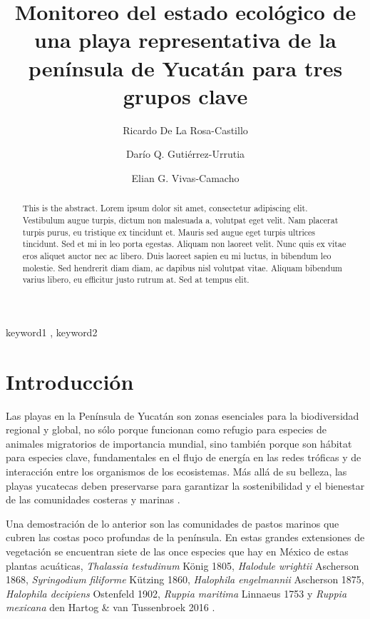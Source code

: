 \documentclass[
  authoryear,
  preprint,
  3p,
  twocolumn]{elsarticle}
\begin{document}
\begin{frontmatter}
\title{Monitoreo del estado ecológico de una playa representativa de la
península de Yucatán para tres grupos clave}
\author[]{Ricardo De La Rosa-Castillo%
%
}
\author[]{Darío Q. Gutiérrez-Urrutia%
%
}
\author[]{Elian G. Vivas-Camacho%
%
}





        
\begin{abstract}
This is the abstract. Lorem ipsum dolor sit amet, consectetur adipiscing
elit. Vestibulum augue turpis, dictum non malesuada a, volutpat eget
velit. Nam placerat turpis purus, eu tristique ex tincidunt et. Mauris
sed augue eget turpis ultrices tincidunt. Sed et mi in leo porta
egestas. Aliquam non laoreet velit. Nunc quis ex vitae eros aliquet
auctor nec ac libero. Duis laoreet sapien eu mi luctus, in bibendum leo
molestie. Sed hendrerit diam diam, ac dapibus nisl volutpat vitae.
Aliquam bibendum varius libero, eu efficitur justo rutrum at. Sed at
tempus elit.
\end{abstract}





\begin{keyword}
    keyword1 \sep 
    keyword2
\end{keyword}
\end{frontmatter}
    

\section{Introducción}\label{introducciuxf3n}

Las playas en la Península de Yucatán son zonas esenciales para la
biodiversidad regional y global, no sólo porque funcionan como refugio
para especies de animales migratorios de importancia mundial, sino
también porque son hábitat para especies clave, fundamentales en el
flujo de energía en las redes tróficas y de interacción entre los
organismos de los ecosistemas. Más allá de su belleza, las playas
yucatecas deben preservarse para garantizar la sostenibilidad y el
bienestar de las comunidades costeras y marinas
\citep{AguilarMedrano2007}.

Una demostración de lo anterior son las comunidades de pastos marinos
que cubren las costas poco profundas de la península. En estas grandes
extensiones de vegetación se encuentran siete de las once especies que
hay en México de estas plantas acuáticas, \emph{Thalassia testudinum}
König 1805, \emph{Halodule wrightii} Ascherson 1868, \emph{Syringodium
filiforme} Kützing 1860, \emph{Halophila engelmannii} Ascherson 1875,
\emph{Halophila decipiens} Ostenfeld 1902, \emph{Ruppia maritima}
Linnaeus 1753 y \emph{Ruppia mexicana} den Hartog \& van Tussenbroek
2016 \citep{EspinozaAvalos1996, DENHARTOG201638}.
\end{document}
